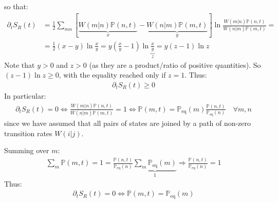 \documentclass[../../main.tex]{subfiles}
\begin{document}
so that:
\begin{align*}
    \partial_t S_R(t) &= \frac{1}{2} \sum_{mn} \left[\underbrace{W(m|n)\mathbb{P}(n,t)}_{x} -\underbrace{ W(n|m) \mathbb{P}(m,t)}_{y}\right] \ln \frac{W(m|n)\mathbb{P}(n,t)}{W(n|m)\mathbb{P}(m,t)} =\\
    &= \frac{1}{2} (x-y) \ln \frac{x}{y} = y \left(\frac{x}{y} -1 \right) \ln \underbrace{\frac{x}{y}}_{z} = y(z-1) \ln z
\end{align*}
Note that $y > 0$ and $z > 0$ (as they are a product/ratio of positive quantities). So $(z-1)\ln z \geq 0$, with the equality reached only if $z=1$. Thus:
\begin{align*}
    \partial_t S_R(t) \geq 0
\end{align*}
In particular:
\begin{align*}
    \partial_t S_R(t) = 0 \Leftrightarrow \frac{W(m|n)\mathbb{P}(n,t)}{W(n|m)\mathbb{P}(m,t)} = 1 \Leftrightarrow \mathbb{P}(m,t) = \mathbb{P}_{\mathrm{eq}}(m) \frac{\mathbb{P}(n,t)}{\mathbb{P}_{\mathrm{eq} }(n)}  \quad \forall m,n
\end{align*}
since we have assumed that all pairs of states are joined by a path of non-zero transition rates $W(i|j)$.

\medskip

Summing over $m$:
\begin{align*}
    \sum_m \mathbb{P}(m,t) = 1 = \frac{\mathbb{P}(n,t)}{\mathbb{P}_{\mathrm{eq}}(n)} \underbrace{\sum_m \mathbb{P}_{\mathrm{eq}}(m) }_{1} \Rightarrow \frac{\mathbb{P}(n,t)}{\mathbb{P}_{\mathrm{eq}}(n)} = 1  
\end{align*}
Thus:
\begin{align*}
    \partial_t S_R(t) = 0 \Leftrightarrow \mathbb{P}(m,t) = \mathbb{P}_{\mathrm{eq}}(m)
\end{align*}
\end{document}
